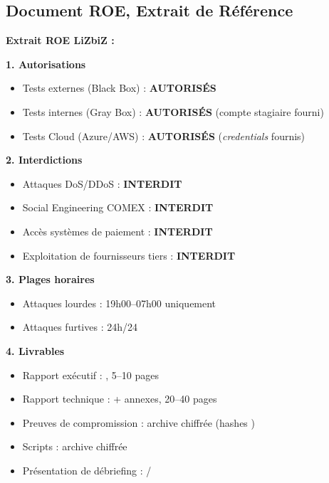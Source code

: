 \subsection{Document ROE, Extrait de Référence}

\begin{boxlizbiz}
\textbf{Extrait ROE LiZbiZ :}

\smallskip
\textbf{1. Autorisations}
\begin{itemize}
    \item Tests externes (Black Box) : \textbf{AUTORISÉS}
    \item Tests internes (Gray Box) : \textbf{AUTORISÉS}
          (compte \og{}stagiaire\fg{} fourni)
    \item Tests Cloud (Azure/AWS) : \textbf{AUTORISÉS}
          (\textit{credentials} fournis)
\end{itemize}

\textbf{2. Interdictions}
\begin{itemize}
    \item Attaques DoS/DDoS : \textbf{INTERDIT}
    \item Social Engineering COMEX : \textbf{INTERDIT}
    \item Accès systèmes de paiement : \textbf{INTERDIT}
    \item Exploitation de fournisseurs tiers : \textbf{INTERDIT}
\end{itemize}

\textbf{3. Plages horaires}
\begin{itemize}
    \item Attaques lourdes : 19h00--07h00 uniquement
    \item Attaques furtives : 24h/24
\end{itemize}

\textbf{4. Livrables}
\begin{itemize}
    \item Rapport exécutif : , 5--10 pages
    \item Rapport technique :  + annexes, 20--40 pages
    \item Preuves de compromission : archive  chiffrée (hashes )
    \item Scripts  : archive  chiffrée
    \item Présentation de débriefing : /
\end{itemize}
\end{boxlizbiz}

